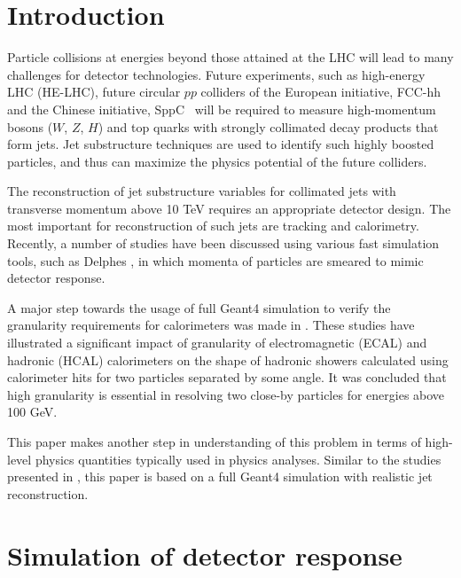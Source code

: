\documentclass[final,1p,11pt]{elsarticle}
\begin{document}
\linenumbers

\section{Introduction}

Particle collisions at energies  beyond those attained at the LHC will lead to many challenges for detector technologies.
Future experiments, such as high-energy LHC (HE-LHC),
future circular $pp$ colliders of the European initiative, FCC-hh~\cite{Benedikt:2206376} and the Chinese initiative, SppC~\cite{Tang:2015qga} will be required to measure high-momentum bosons ($W$, $Z$, $H$) and top quarks with strongly 
collimated decay products that form jets. 
Jet substructure techniques are used
to identify such highly boosted particles, and thus can maximize the physics potential of the future colliders.

The reconstruction of jet substructure  variables for collimated jets with transverse momentum above 10 TeV 
requires an appropriate detector design. The most important for reconstruction of such jets are tracking and calorimetry.
Recently, a number of studies \cite{Calkins:2013ega,Chekanov:2015ihl,Coleman:2017fiq} 
have been discussed using various fast simulation tools, such as 
Delphes  \cite{deFavereau:2013fsa}, in which momenta of particles
are smeared to mimic detector response. 

A major step towards the usage of full Geant4 simulation to verify the granularity requirements 
for calorimeters was made in \cite{Chekanov:2016ppq}.
These studies have illustrated a significant impact 
of granularity of electromagnetic (ECAL) and hadronic (HCAL) calorimeters on the
shape of hadronic showers  calculated using calorimeter hits 
for two particles separated  by some angle. It was concluded that high granularity is essential 
in resolving two close-by particles for energies above 100 GeV. 

This paper makes another step in  understanding of this problem in terms 
of high-level physics quantities typically used in physics analyses.
Similar to the studies presented in \cite{Chekanov:2016ppq}, this paper is based on a full
Geant4 simulation with realistic jet reconstruction.

\section{Simulation of detector response}
\label{sec:sim}
\end{document}
